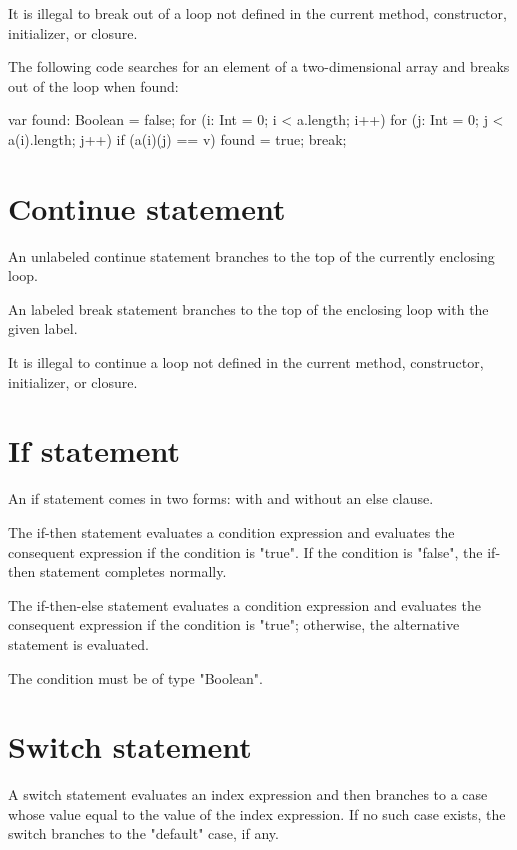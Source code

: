 It is illegal to break out of a loop not defined in the current
method, constructor, initializer, or closure.

The following code searches for an element of a two-dimensional
array and breaks out of the loop when found:

\begin{xten}
var found: Boolean = false;
for (i: Int = 0; i < a.length; i++)
    for (j: Int = 0; j < a(i).length; j++)
        if (a(i)(j) == v) {
            found = true;
            break;
        }
\end{xten}

\section{Continue statement}

An unlabeled continue statement branches to the top of the
currently enclosing loop.

An labeled break statement branches to the top of the enclosing loop
with the given label.

It is illegal to continue a loop not defined in the current
method, constructor, initializer, or closure.

\section{If statement}

An if statement comes in two forms: with and without an else
clause.

The if-then statement evaluates a condition expression and 
evaluates the consequent expression if the condition is
\xcd"true".  If the 
condition is \xcd"false",
the if-then statement completes normally.

The if-then-else statement evaluates a condition expression and 
evaluates the consequent expression if the condition is
\xcd"true"; otherwise, the alternative statement is evaluated.

The condition must be of type \xcd"Boolean".

\section{Switch statement}

A switch statement evaluates an index expression and then branches to
a case whose value equal to the value of the index expression.
If no such case exists, the switch branches to the 
\xcd"default" case, if any.

